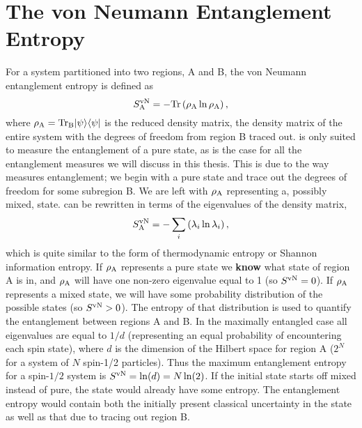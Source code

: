 \section{The von Neumann Entanglement Entropy}
For a system partitioned into two regions, A and B, the von Neumann entanglement entropy \vn is defined as
\begin{equation}
	S^{\text{vN}}_\text{A} = -\rm{Tr}\left({\rho_A \ln \rho_A}\right),
\end{equation}
where $\rho_{\rm{A}}=\rm{Tr}_B\lvert {\psi} \rangle\langle {\psi} \rvert$ is the reduced density matrix, the density matrix of the entire system with the degrees of freedom from region B traced out.
\vn is only suited to measure the entanglement of a pure state, as is the case for all the entanglement measures we will discuss in this thesis.
This is due to the way \vn measures entanglement; we begin with a pure state and trace out the degrees of freedom for some subregion B.  
We are left with $\rho_{\rm A}$ representing a, possibly mixed, state.
\vn can be rewritten in terms of the eigenvalues of the density matrix,
\begin{equation}
S^{\text{vN}}_\text{A} = -\sum_i \left(\lambda_i \ln \lambda_i\right),
\end{equation}
which is quite similar to the form of thermodynamic entropy or Shannon information entropy. If $\rho_{\rm A}$ represents a pure state we {\bf know} what state of region A is in, and $\rho_{\rm A}$ will have one non-zero eigenvalue equal to 1 (so $S^{\text{vN}} = 0$).
If $\rho_{\rm A}$ represents a mixed state, we will have some probability distribution of the possible states (so $S^{\text{vN}} > 0$). The entropy of that distribution is used to quantify the entanglement between regions A and B.
In the maximally entangled case all eigenvalues are equal to $1/d$ (representing an equal probability of encountering each spin state), where $d$ is the dimension of the Hilbert space for region A ($2^N$ for a system of $N$ spin-1/2 particles). Thus the maximum entanglement entropy for a spin-$1/2$ system is $S^{\text{vN}}= \ln (d) = N \ln(2)$. 
If the initial state starts off mixed instead of pure, the state would already have some entropy. The entanglement entropy would contain both the initially present classical uncertainty in the state as well as that due to tracing out region B.

